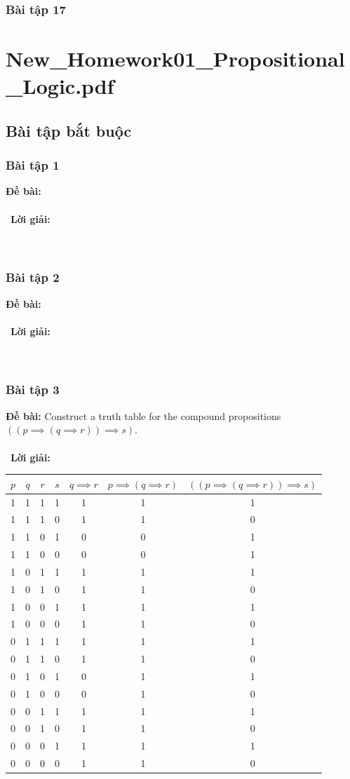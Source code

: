\documentclass[a4paper]{article}
\begin{document}
\subsubsection{Bài tập 17}

\clearpage
\clearpage

\section{New\_Homework01\_Propositional\_Logic.pdf}
\subsection{Bài tập bắt buộc}
\subsubsection{Bài tập 1}
\textbf{Đề bài:} 
\\\ \\\
\textbf{Lời giải:} \\\ \\\
\clearpage
\subsubsection{Bài tập 2}
\textbf{Đề bài:} 
\\\ \\\
\textbf{Lời giải:} \\\ \\\
\clearpage
\subsubsection{Bài tập 3}
\textbf{Đề bài:}  Construct a truth table for the compound propositions $((p\implies (q\implies r))\implies s)$.
\\\ \\\
\textbf{Lời giải:} \begin{tabular}{|c|c|c|c|c|c|c|}
\hline
$p$ & $q$ & $r$ & $s$ & $q\implies r$ & $p\implies (q\implies r)$ & $((p\implies (q\implies r))\implies s)$  \\
\hline 1&1&1&1&1&1&1\\
\hline 1&1&1&0&1&1&0\\
\hline 1&1&0&1&0&0&1\\
\hline 1&1&0&0&0&0&1\\
\hline 1&0&1&1&1&1&1\\
\hline 1&0&1&0&1&1&0\\
\hline 1&0&0&1&1&1&1\\
\hline 1&0&0&0&1&1&0\\
\hline 0&1&1&1&1&1&1\\
\hline 0&1&1&0&1&1&0\\
\hline 0&1&0&1&0&1&1\\
\hline 0&1&0&0&0&1&0\\
\hline 0&0&1&1&1&1&1\\
\hline 0&0&1&0&1&1&0\\
\hline 0&0&0&1&1&1&1\\
\hline 0&0&0&0&1&1&0\\
\hline
\end{tabular}
 \\\ \\\
\clearpage
\end{document}
